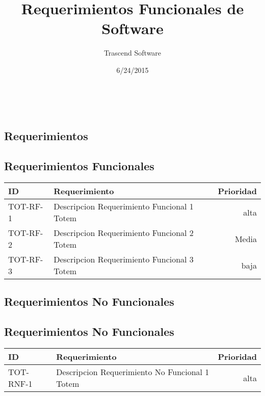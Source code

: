 \documentclass{article}
\title{Requerimientos Funcionales de Software}
\date
{
6/24/2015
}
\author{
Trascend Software
}
\begin{document}


\maketitle %
\newpage %
\
\begin{center}
	\section{Requerimientos}
\end{center}

\subsection{Requerimientos Funcionales}
\begin{tabular}{| l | p{7cm} | r |}
\hline
\bf ID & \bf Requerimiento & \bf Prioridad \\
\hline
TOT-RF-1&Descripcion Requerimiento Funcional 1 Totem&alta \\
\hline
TOT-RF-2&Descripcion Requerimiento Funcional 2 Totem&Media \\
\hline
TOT-RF-3&Descripcion Requerimiento Funcional 3 Totem&baja \\
\hline
\end{tabular}

\begin{center}
	\section{Requerimientos No Funcionales}
\end{center}

\subsection{Requerimientos No Funcionales}
\begin{tabular}{| l | p{7cm} | r |}
\hline
\bf ID & \bf Requerimiento & \bf Prioridad \\
\hline
TOT-RNF-1&Descripcion Requerimiento No Funcional 1 Totem&alta \\
\hline
\end{tabular}
\end{document}
